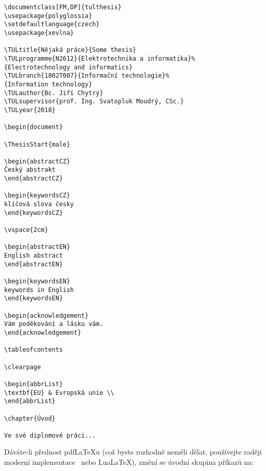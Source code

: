 \documentclass[FF,fonts]{tulthesis}
\newenvironment{myquote}{\begin{list}{}{\setlength\leftmargin\parindent}\item[]}{\end{list}}
\newenvironment{listing}{\begin{myquote}\color{\tulcolor}}{\end{myquote}}
\begin{document}
\begin{listing}
\begin{verbatim}
\documentclass[FM,DP]{tulthesis}
\usepackage{polyglossia}
\setdefaultlanguage{czech}
\usepackage{xevlna}

\TULtitle{Nějaká práce}{Some thesis}
\TULprogramme{N2612}{Elektrotechnika a informatika}%
{Electrotechnology and informatics}
\TULbranch{1802T007}{Informační technologie}%
{Information technology}
\TULauthor{Bc. Jiří Chytrý}
\TULsupervisor{prof. Ing. Svatopluk Moudrý, CSc.}
\TULyear{2018}

\begin{document}

\ThesisStart{male}

\begin{abstractCZ}
Český abstrakt
\end{abstractCZ}

\begin{keywordsCZ}
klíčová slova česky
\end{keywordsCZ}

\vspace{2cm}

\begin{abstractEN}
English abstract
\end{abstractEN}

\begin{keywordsEN}
keywords in English
\end{keywordsEN}

\begin{acknowledgement}
Vám poděkování a lásku vám.
\end{acknowledgement}

\tableofcontents

\clearpage

\begin{abbrList}
\textbf{EU} & Evropská unie \\
\end{abbrList}

\chapter{Úvod}

Ve své diplomové práci...
\end{verbatim}
\end{listing}

Dáváte-li přednost pdf\LaTeX u (což byste rozhodně neměli dělat, používejte raději
moderní implementace \XeLaTeX\ nebo Lua\LaTeX), změní se úvodní skupina příkazů na:
\end{document}

